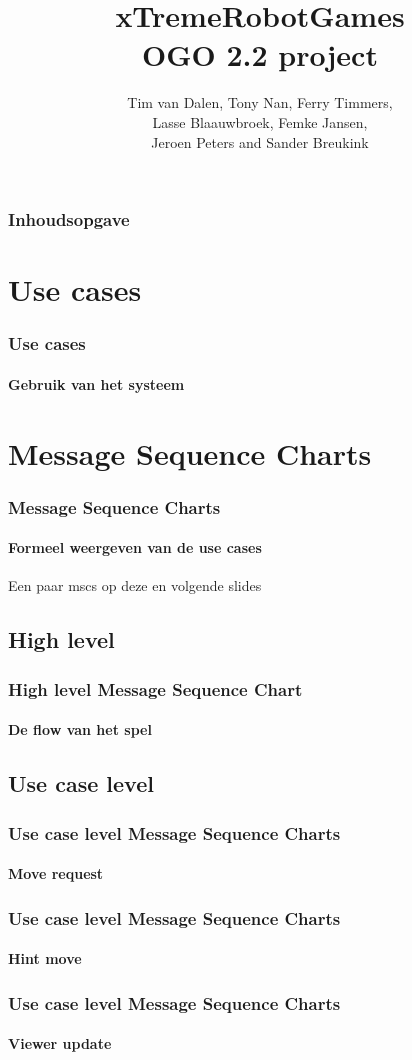 \documentclass{beamer}
\title{xTremeRobotGames\\\small OGO 2.2 project}
\author{Tim van Dalen, Tony Nan, Ferry Timmers,\\ 
                Lasse Blaauwbroek, Femke Jansen,\\
                Jeroen Peters and Sander Breukink\\}
\institute[TU/e]{}
\begin{document}
	\frame{\titlepage}
	
	\begin{frame}
	    \frametitle{Inhoudsopgave}
    		\tableofcontents
  	\end{frame}

	\section{Use cases}
	\begin{frame}
		\frametitle{Use cases}
		\framesubtitle{Gebruik van het systeem}
		
	\end{frame}

	\section{Message Sequence Charts}
	\begin{frame}
		\frametitle{Message Sequence Charts}
		\framesubtitle{Formeel weergeven van de use cases}
		Een paar mscs op deze en volgende slides
	\end{frame}
	
	\subsection{High level}
	\begin{frame}
		\frametitle{High level Message Sequence Chart}
		\framesubtitle{De flow van het spel}
		
	\end{frame}
	\subsection{Use case level}

	\begin{frame}
		\frametitle{Use case level Message Sequence Charts}
		\framesubtitle{Move request}
		\scalebox{0.9}{
			
		}
		
	\end{frame}
	\begin{frame}
		\frametitle{Use case level Message Sequence Charts}
		\framesubtitle{Hint move}
		\scalebox{0.8}{
			
		}
		
	\end{frame}
	\begin{frame}
		\frametitle{Use case level Message Sequence Charts}
		\framesubtitle{Viewer update}
		\scalebox{0.8}{
			
		}
		
	\end{frame}
\end{document}
